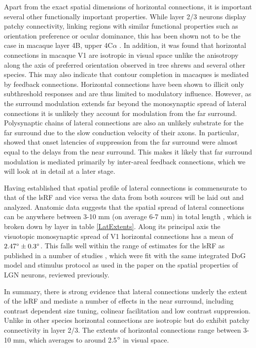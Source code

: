 Apart from the exact spatial dimensions of horizontal connections, it
is important several other functionally important properties. While
layer 2/3 neurons display patchy connectivity, linking regions with
similar functional properties such as orientation preference or ocular
dominance, this has been shown not to be the case in macaque layer 4B,
upper 4C$\alpha$ \citep{Angelucci2002}. In addition, it was found that
horizontal connections in macaque V1 are isotropic in visual space
unlike the anisotropy along the axis of preferred orientation observed
in tree shrews \citep{Bosking1997} and several other species. This may
also indicate that contour completion in macaques is mediated by
feedback connections. Horizontal connections have been shown to
illicit only subthreshold responses \citep{Hirsch1991} and are thus
limited to modulatory influence. However, as the surround modulation
extends far beyond the monosynaptic spread of lateral connections it
is unlikely they account for modulation from the far
surround. Polysynaptic chains of lateral connections are also an
unlikely substrate for the far surround due to the slow conduction
velocity of their axons. In particular, \cite{Bair2003} showed that
onset latencies of suppression from the far surround were almost equal
to the delays from the near surround. This makes it likely that far
surround modulation is mediated primarily by inter-areal feedback
connections, which we will look at in detail at a later stage.

Having established that spatial profile of lateral connections is
commensurate to that of the lsRF and vice versa the data from both
sources will be laid out and analyzed. Anatomic data suggests that the
spatial spread of lateral connections can be anywhere between 3-10 mm
(on average 6-7 mm) in total length \citep{Angelucci2002}, which is
broken down by layer in table \ref{LatExtents}. Along its principal
axis the visuotopic monosynaptic spread of V1 horizontal connections
has a mean of $2.47\degree \pm 0.3\degree$. This falls well within the
range of estimates for the lsRF as published in a number of studies
\citep{Shushruth2009,Sceniak1999,Sceniak2001}, which were fit with the
same integrated DoG model and stimulus protocol as used in the
\cite{Sceniak2006} paper on the spatial properties of LGN neurons,
reviewed previously.

In summary, there is strong evidence that lateral connections underly
the extent of the lsRF and mediate a number of effects in the near
surround, including contrast dependent size tuning, colinear
facilitation and low contrast suppression. Unlike in other species
horizontal connections are isotropic but do exhibit patchy
connectivity in layer 2/3. The extents of horizontal connections range
between 3-10 mm, which averages to around 2.5$\degree$ in visual
space.



